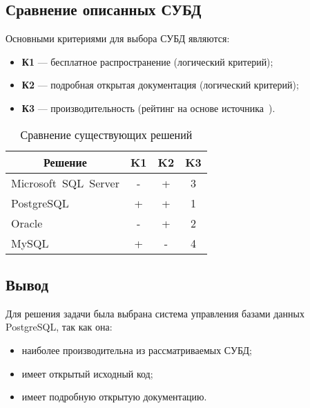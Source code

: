 \subsection{Сравнение описанных СУБД}

Основными критериями для выбора СУБД являются:
\begin{itemize}
    \item \textbf{К1} --- бесплатное распространение (логический критерий);
    \item \textbf{К2} --- подробная открытая документация (логический критерий);
    \item \textbf{К3} --- производительность (рейтинг на основе
        источника~\cite{art08}).
\end{itemize}

\begin{table}[ht!]
\captionsetup{format=hang,justification=raggedright,
              singlelinecheck=off,width=9cm}
\centering
\caption{Сравнение существующих решений\label{tab:01}}
\begin{tabular}[Hc]{|p{5cm}|c|c|c|}
    \hline
    \multicolumn{1}{|c}{\textbf{Решение}} & \multicolumn{1}{|c|}{\textbf{K1}} &
    \multicolumn{1}{c|}{\textbf{K2}} & \multicolumn{1}{c|}{\textbf{K3}}\\
    \hline
    \mbox{Microsoft SQL Server}  & - & + & 3\\
    \hline                                                           
    \mbox{PostgreSQL}            & + & + & 1\\
    \hline                                                           
    \mbox{Oracle}                & - & + & 2\\
    \hline                                                           
    \mbox{MySQL}                 & + & - & 4\\
    \hline
\end{tabular}
\end{table}

\subsection*{Вывод}

Для решения задачи была выбрана система управления базами данных
PostgreSQL, так как она:

\begin{itemize}
    \item наиболее производительна из рассматриваемых СУБД;
    \item имеет открытый исходный код;
    \item имеет подробную открытую документацию.
\end{itemize}

